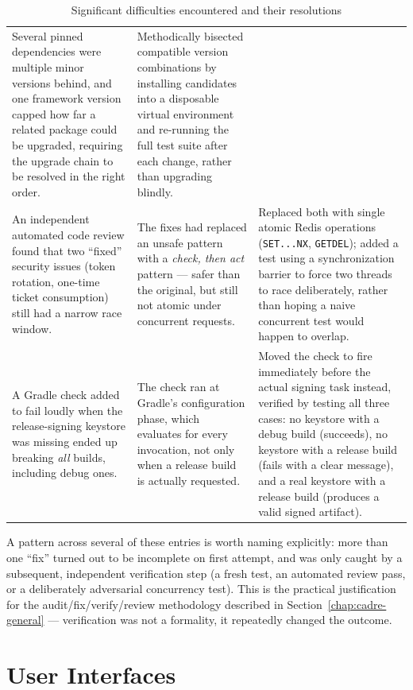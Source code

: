 \begin{table}[h!]
\begin{tabularx}{\textwidth}{p{3.6cm}Xp{4.7cm}}
Several pinned dependencies were multiple minor versions behind, and one framework version capped how far a related package could be upgraded, requiring the upgrade chain to be resolved in the right order. &
Methodically bisected compatible version combinations by installing candidates into a disposable virtual environment and re-running the full test suite after each change, rather than upgrading blindly. \\
\addlinespace
An independent automated code review found that two ``fixed'' security issues (token rotation, one-time ticket consumption) still had a narrow race window. &
The fixes had replaced an unsafe pattern with a \emph{check, then act} pattern --- safer than the original, but still not atomic under concurrent requests. &
Replaced both with single atomic Redis operations (\texttt{SET...NX}, \texttt{GETDEL}); added a test using a synchronization barrier to force two threads to race deliberately, rather than hoping a naive concurrent test would happen to overlap. \\
\addlinespace
A Gradle check added to fail loudly when the release-signing keystore was missing ended up breaking \emph{all} builds, including debug ones. &
The check ran at Gradle's configuration phase, which evaluates for every invocation, not only when a release build is actually requested. &
Moved the check to fire immediately before the actual signing task instead, verified by testing all three cases: no keystore with a debug build (succeeds), no keystore with a release build (fails with a clear message), and a real keystore with a release build (produces a valid signed artifact). \\
\bottomrule
\end{tabularx}
\caption{Significant difficulties encountered and their resolutions}
\label{tab:difficulties}
\end{table}

A pattern across several of these entries is worth naming explicitly: more than one ``fix'' turned out to be incomplete on first attempt, and was only caught by a subsequent, independent verification step (a fresh test, an automated review pass, or a deliberately adversarial concurrency test). This is the practical justification for the audit/fix/verify/review methodology described in Section~\ref{chap:cadre-general} --- verification was not a formality, it repeatedly changed the outcome.

\section{User Interfaces}

